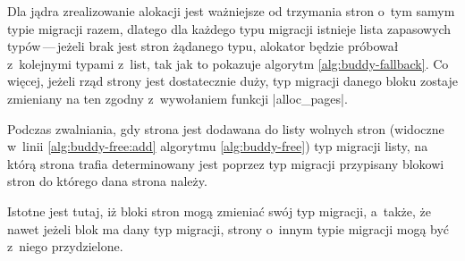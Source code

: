 Dla jądra zrealizowanie alokacji jest ważniejsze od trzymania stron
o~tym samym typie migracji razem, dlatego dla każdego typu migracji
istnieje lista zapasowych typów\,---\,jeżeli brak jest stron żądanego
typu, alokator będzie próbował z~kolejnymi typami z~list, tak jak to
pokazuje algorytm \ref{alg:buddy-fallback}.  Co więcej, jeżeli rząd
strony jest dostatecznie duży, typ migracji danego bloku zostaje
zmieniany na ten zgodny z~wywołaniem funkcji \code|alloc_pages|.

Podczas zwalniania, gdy strona jest dodawana do listy wolnych stron
(widoczne w~linii \ref{alg:buddy-free:add} algorytmu
\ref{alg:buddy-free}) typ migracji listy, na którą strona trafia
determinowany jest poprzez typ migracji przypisany blokowi stron do
którego dana strona należy.

Istotne jest tutaj, iż bloki stron mogą zmieniać swój typ migracji,
a~także, że nawet jeżeli blok ma dany typ migracji, strony o~innym
typie migracji mogą być z~niego przydzielone.
